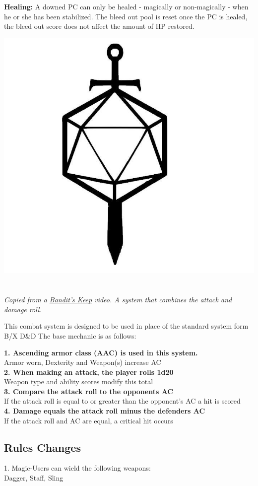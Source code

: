 \documentclass[letterpaper,sansserif,tightsqueeze]{rpg-module}
\begin{document}
\textbf{Healing:} A downed PC can only be healed - magically or non-magically - when he or she has been stabilized. The bleed out pool is reset once the PC is healed, the bleed out score does not affect the amount of HP restored.\\

\vspace{0.5cm}

\begin{center}
	\includegraphics[width = 0.3\linewidth]{d20_weapons.jpg}
\end{center}
\section*{}
\textit{Copied from a \href{https://www.youtube.com/watch?v=VflmXb0EAbI}{Bandit's Keep} video. A system that combines the attack and damage roll.}

This combat system is designed to be used in place of the standard system form B/X D\&D
The base mechanic is as follows:

\textbf{1. Ascending armor class (AAC) is used in this system.}\\
Armor worn, Dexterity and Weapon(s) increase AC\\
\textbf{2. When making an attack, the player rolls 1d20}\\
Weapon type and ability scores modify this total\\
\textbf{3. Compare the attack roll to the opponents AC}\\
If the attack roll is equal to or greater than the opponent's AC a hit is scored\\
\textbf{4. Damage equals the attack roll minus the defenders AC}\\
If the attack roll and AC are equal, a critical hit occurs

\vspace{0.5cm}

\subsection*{Rules Changes}
1. Magic-Users can wield the following weapons:\\
Dagger, Staff, Sling
\end{document}
